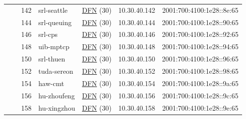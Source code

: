 \begin{small}
\begin{center}
\begin{longtable}{|c|c|c|c|c|c|c|c|}
  &  & \tiny{142} & \multicolumn{1}{|l|}{\tiny{srl-seattle}} & \multicolumn{2}{|c|}{\tiny{\href{https://www.dfn.de}{DFN} (30)}} & \tiny{10.30.40.142} & \tiny{2001:700:4100:1e28::8e:65} \\* \cline{3-3}\cline{4-4}\cline{5-5}\cline{6-6}\cline{7-7}\cline{8-8}
  &  & \tiny{144} & \multicolumn{1}{|l|}{\tiny{srl-queuing}} & \multicolumn{2}{|c|}{\tiny{\href{https://www.dfn.de}{DFN} (30)}} & \tiny{10.30.40.144} & \tiny{2001:700:4100:1e28::90:65} \\* \cline{3-3}\cline{4-4}\cline{5-5}\cline{6-6}\cline{7-7}\cline{8-8}
  &  & \tiny{146} & \multicolumn{1}{|l|}{\tiny{srl-cps}} & \multicolumn{2}{|c|}{\tiny{\href{https://www.dfn.de}{DFN} (30)}} & \tiny{10.30.40.146} & \tiny{2001:700:4100:1e28::92:65} \\* \cline{3-3}\cline{4-4}\cline{5-5}\cline{6-6}\cline{7-7}\cline{8-8}
  &  & \tiny{148} & \multicolumn{1}{|l|}{\tiny{uib-mptcp}} & \multicolumn{2}{|c|}{\tiny{\href{https://www.dfn.de}{DFN} (30)}} & \tiny{10.30.40.148} & \tiny{2001:700:4100:1e28::94:65} \\* \cline{3-3}\cline{4-4}\cline{5-5}\cline{6-6}\cline{7-7}\cline{8-8}
  &  & \tiny{150} & \multicolumn{1}{|l|}{\tiny{srl-thuen}} & \multicolumn{2}{|c|}{\tiny{\href{https://www.dfn.de}{DFN} (30)}} & \tiny{10.30.40.150} & \tiny{2001:700:4100:1e28::96:65} \\* \cline{3-3}\cline{4-4}\cline{5-5}\cline{6-6}\cline{7-7}\cline{8-8}
  &  & \tiny{152} & \multicolumn{1}{|l|}{\tiny{tuda-sereon}} & \multicolumn{2}{|c|}{\tiny{\href{https://www.dfn.de}{DFN} (30)}} & \tiny{10.30.40.152} & \tiny{2001:700:4100:1e28::98:65} \\* \cline{3-3}\cline{4-4}\cline{5-5}\cline{6-6}\cline{7-7}\cline{8-8}
  &  & \tiny{154} & \multicolumn{1}{|l|}{\tiny{haw-cmt}} & \multicolumn{2}{|c|}{\tiny{\href{https://www.dfn.de}{DFN} (30)}} & \tiny{10.30.40.154} & \tiny{2001:700:4100:1e28::9a:65} \\* \cline{3-3}\cline{4-4}\cline{5-5}\cline{6-6}\cline{7-7}\cline{8-8}
  &  & \tiny{156} & \multicolumn{1}{|l|}{\tiny{hu-zhoufeng}} & \multicolumn{2}{|c|}{\tiny{\href{https://www.dfn.de}{DFN} (30)}} & \tiny{10.30.40.156} & \tiny{2001:700:4100:1e28::9c:65} \\* \cline{3-3}\cline{4-4}\cline{5-5}\cline{6-6}\cline{7-7}\cline{8-8}
  &  & \tiny{158} & \multicolumn{1}{|l|}{\tiny{hu-xingzhou}} & \multicolumn{2}{|c|}{\tiny{\href{https://www.dfn.de}{DFN} (30)}} & \tiny{10.30.40.158} & \tiny{2001:700:4100:1e28::9e:65} \\* \cline{3-3}\cline{4-4}\cline{5-5}\cline{6-6}\cline{7-7}\cline{8-8}

\end{longtable}
\end{center}
\end{small}

